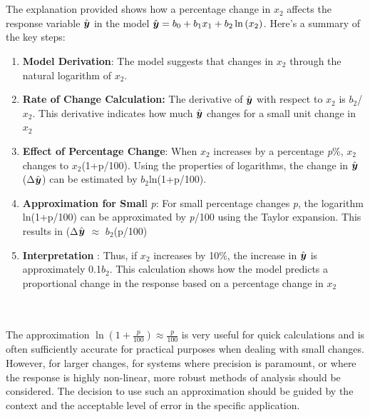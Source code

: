 \documentclass[12pt]{article}
\begin{document}
\begin{enumerate}
\newpage

 \\ \\ 

The explanation provided shows how a percentage change in $x_2$ affects the response variable $\hat{\boldsymbol{y}}$ in the model $\hat{\boldsymbol{y}} = b_0 + b_1 x_1 + b_2 \ln\left(x_2\right)$. Here’s a summary of the key steps: 

\begin{enumerate}
    \item \textbf{Model Derivation}: The model suggests that changes in $x_2$ through the natural logarithm of $x_2$.
    \item \textbf{Rate of Change Calculation:} The derivative of $\hat{\boldsymbol{y}}$ with respect to  $x_2$ is $b_2$/$x_2$. This derivative indicates how much $\hat{\boldsymbol{y}}$ changes for a small unit change in $x_2$
    \item \textbf{Effect of Percentage Change}: When $x_2$ increases by a percentage \textit{p}\%, $x_2$ changes to $x_2$(1+p/100). Using the properties of logarithms, the change in $\hat{\boldsymbol{y}}$(Δ$\hat{\boldsymbol{y}}$) can be estimated by $b_2$ln(1+p/100).
    \item \textbf{Approximation for Smal}l \textit{p}: For small percentage changes \textit{p}, the logarithm ln⁡(1+p/100) can be approximated by \textit{p}/100 using the Taylor expansion. This results in (Δ$\hat{\boldsymbol{y}}$ $\approx $ $b_2$(p/100)
    \item \textbf{Interpretation} : Thus, if $x_2$ increases by 10\%, the increase in $\hat{\boldsymbol{y}}$ is approximately 0.1$b_2$. This calculation shows how the model predicts a proportional change in the response based on a percentage change in $x_2$ 
\end{enumerate}
 

 \\ \\ 
The approximation $\ln\left(1 + \frac{p}{100}\right) \approx \frac{p}{100}$ is very useful for quick calculations and is often sufficiently accurate for practical purposes when dealing with small changes. However, for larger changes, for systems where precision is paramount, or where the response is highly non-linear, more robust methods of analysis should be considered. The decision to use such an approximation should be guided by the context and the acceptable level of error in the specific application.



\end{enumerate}
\end{document}
